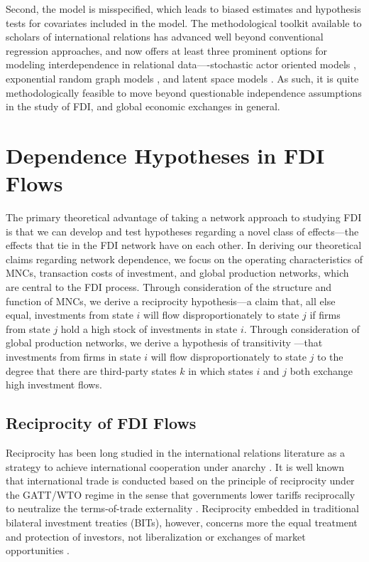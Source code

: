 \documentclass[reqno,onecolumn,letterpaper,12pt]{article}
\begin{document}
Second, the model is misspecified, which leads to biased estimates and hypothesis tests for covariates included in the model. The methodological toolkit available to scholars of international relations has advanced well beyond conventional regression approaches, and now offers at least three prominent options for modeling interdependence in relational data----stochastic actor oriented models \citep[e.g.,][]{camber2010geometry,kinne2016agreeing,kinne2013network,kinne2014dependent,warren2016modeling}, exponential random graph models \citep[e.g.,][]{cranmer2012complex,cranmer2012toward,raeymaeckers2016influence}, and latent space models \citep[e.g.,][]{ward2007disputes,ward2013gravity,metternich2013antigovernment}. As such, it is quite methodologically feasible to move beyond questionable independence assumptions in the study of FDI, and global economic exchanges in general.


\section{Dependence Hypotheses in FDI Flows}

The primary theoretical advantage of taking a network approach to studying FDI is that we can develop and test hypotheses regarding a novel class of effects---the effects that tie in the FDI network have on each other. In deriving our theoretical claims regarding network dependence, we focus on the operating characteristics of MNCs, transaction costs of investment, and global production networks, which are central to the FDI process. Through consideration of the structure and function of MNCs, we derive a reciprocity \citep{garlaschelli2004patterns} hypothesis---a claim that, all else equal, investments from state $i$ will flow disproportionately to state $j$ if firms from state $j$ hold a high stock of investments in state $i$. Through consideration of global production networks, we derive a hypothesis of transitivity \citep{holland1971transitivity}---that investments from firms in state $i$ will flow disproportionately to state $j$ to the degree that there are third-party states $k$ in which states $i$ and $j$ both exchange high investment flows.

\subsection{Reciprocity of FDI Flows}
Reciprocity has been long studied in the international relations literature as a strategy to achieve international cooperation under anarchy \citep[e.g.,][]{Axelrod:1984,Keohane:1984}. It is well known that international trade is conducted based on the principle of reciprocity under the GATT/WTO regime in the sense that governments lower tariffs reciprocally to neutralize the terms-of-trade externality \citep{Bagwell_Staiger:1999}. Reciprocity embedded in traditional bilateral investment treaties (BITs), however, concerns more the equal treatment and protection of investors, not liberalization or exchanges of market opportunities \citep[~56]{DiMascio_Pauwelyn:2008}.
\end{document}
